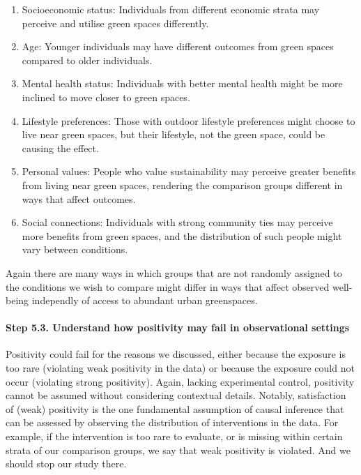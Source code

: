 \documentclass[
  singlecolumn]{article}
\let\oldparagraph\paragraph
\renewcommand{\paragraph}[1]{\oldparagraph{#1}\mbox{}}
\begin{document}
\begin{enumerate}
\def\labelenumi{\alph{enumi}.}
\item
  Socioeconomic status: Individuals from different economic strata may
  perceive and utilise green spaces differently.
\item
  Age: Younger individuals may have different outcomes from green spaces
  compared to older individuals.
\item
  Mental health status: Individuals with better mental health might be
  more inclined to move closer to green spaces.
\item
  Lifestyle preferences: Those with outdoor lifestyle preferences might
  choose to live near green spaces, but their lifestyle, not the green
  space, could be causing the effect.
\item
  Personal values: People who value sustainability may perceive greater
  benefits from living near green spaces, rendering the comparison
  groups different in ways that affect outcomes.
\item
  Social connections: Individuals with strong community ties may
  perceive more benefits from green spaces, and the distribution of such
  people might vary between conditions.
\end{enumerate}

Again there are many ways in which groups that are not randomly assigned
to the conditions we wish to compare might differ in ways that affect
observed well-being independly of access to abundant urban greenspaces.

\paragraph{\texorpdfstring{\textbf{Step 5.3. Understand how positivity
may fail in observational
settings}}{Step 5.3. Understand how positivity may fail in observational settings}}\label{step-5.3.-understand-how-positivity-may-fail-in-observational-settings}

Positivity could fail for the reasons we discussed, either because the
exposure is too rare (violating weak positivity in the data) or because
the exposure could not occur (violating strong positivity). Again,
lacking experimental control, positivity cannot be assumed without
considering contextual details. Notably, satisfaction of (weak)
positivity is the one fundamental assumption of causal inference that
can be assessed by observing the distribution of interventions in the
data. For example, if the intervention is too rare to evaluate, or is
missing within certain strata of our comparison groups, we say that weak
positivity is violated. And we should stop our study there.
\end{document}
